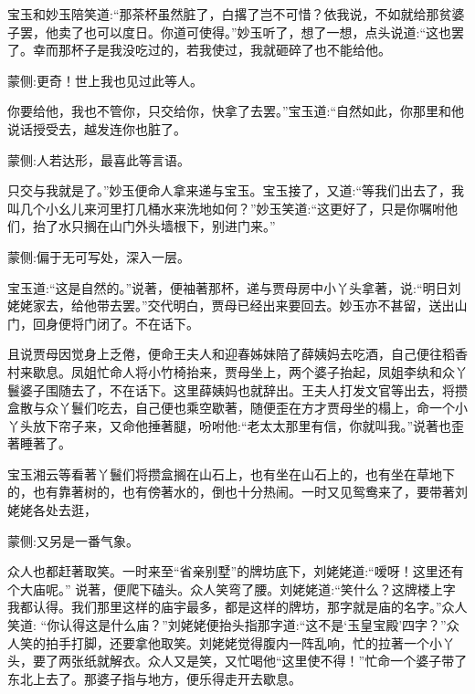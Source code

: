 \begin{parag}
    宝玉和妙玉陪笑道:“那茶杯虽然脏了，白撂了岂不可惜？依我说，不如就给那贫婆子罢，他卖了也可以度日。你道可使得。”妙玉听了，想了一想，点头说道:“这也罢了。幸而那杯子是我没吃过的，若我使过，我就砸碎了也不能给他。\begin{note}蒙侧:更奇！世上我也见过此等人。\end{note}你要给他，我也不管你，只交给你，快拿了去罢。”宝玉道:“自然如此，你那里和他说话授受去，越发连你也脏了。\begin{note}蒙侧:人若达形，最喜此等言语。\end{note}只交与我就是了。”妙玉便命人拿来递与宝玉。宝玉接了，又道:“等我们出去了，我叫几个小幺儿来河里打几桶水来洗地如何？”妙玉笑道:“这更好了，只是你嘱咐他们，抬了水只搁在山门外头墙根下，别进门来。”\begin{note}蒙侧:偏于无可写处，深入一层。\end{note}宝玉道:“这是自然的。”说著，便袖著那杯，递与贾母房中小丫头拿著，说:“明日刘姥姥家去，给他带去罢。”交代明白，贾母已经出来要回去。妙玉亦不甚留，送出山门，回身便将门闭了。不在话下。
\end{parag}


\begin{parag}
    且说贾母因觉身上乏倦，便命王夫人和迎春姊妹陪了薛姨妈去吃酒，自己便往稻香村来歇息。凤姐忙命人将小竹椅抬来，贾母坐上，两个婆子抬起，凤姐李纨和众丫鬟婆子围随去了，不在话下。这里薛姨妈也就辞出。王夫人打发文官等出去，将攒盒散与众丫鬟们吃去，自己便也乘空歇著，随便歪在方才贾母坐的榻上，命一个小丫头放下帘子来，又命他捶著腿，吩咐他:“老太太那里有信，你就叫我。”说著也歪著睡著了。
\end{parag}


\begin{parag}
    宝玉湘云等看著丫鬟们将攒盒搁在山石上，也有坐在山石上的，也有坐在草地下的，也有靠著树的，也有傍著水的，倒也十分热闹。一时又见鸳鸯来了，要带著刘姥姥各处去逛，\begin{note}蒙侧:又另是一番气象。\end{note}众人也都赶著取笑。一时来至“省亲别墅”的牌坊底下，刘姥姥道:“嗳呀！这里还有个大庙呢。” 说著，便爬下磕头。众人笑弯了腰。刘姥姥道:“笑什么？这牌楼上字我都认得。我们那里这样的庙宇最多，都是这样的牌坊，那字就是庙的名字。”众人笑道: “你认得这是什么庙？”刘姥姥便抬头指那字道:“这不是‘玉皇宝殿’四字？”众人笑的拍手打脚，还要拿他取笑。刘姥姥觉得腹内一阵乱响，忙的拉著一个小丫头，要了两张纸就解衣。众人又是笑，又忙喝他“这里使不得！”忙命一个婆子带了东北上去了。那婆子指与地方，便乐得走开去歇息。
\end{parag}


